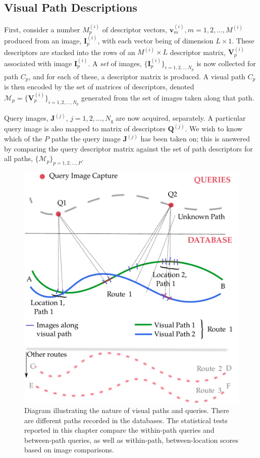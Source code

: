 \subsection{Visual Path Descriptions} First, consider a number $M_p^{(i)}$ of descriptor vectors, $\mathbf{v}_m^{(i)}, m=1,2,\ldots,M^{(i)}$ produced from an image, $\mathbf{I}^{(i)}_p$, with each vector being of  dimension $L \times 1$.  These descriptors are stacked into the rows of an $M^{(i)}\times L$ descriptor matrix, $\mathbf{V}^{(i)}_p$ associated with image $\mathbf{I}^{(i)}_p$.  A \textit{set} of images, $\lbrace \mathbf{I}^{(i)}_p\rbrace_{i=1,2,\ldots\,N_p}$ is now collected for path $C_p$, and for each of these, a descriptor matrix is produced.  A visual path $C_p$ is then encoded by the set of matrices of descriptors, denoted $\mathcal{M}_p=\lbrace \mathbf{V}^{(i)}_p \rbrace_{i=1,2,\ldots,N_p}$ generated from the set of images taken along that path.
 
Query images, $\mathbf{J}^{(j)}$, $j=1,2,\ldots,N_q$ are now acquired, separately.  A particular query image is also mapped to matrix of descriptors $\mathbf{Q}^{(j)}$. We wish to know which of the $P$ paths the query image $\mathbf{J}^{(j)}$ has been taken on; this is answered by comparing the query descriptor matrix against the set of path descriptors for all paths, $\lbrace \mathcal{M}_p \rbrace_{p=1,2,\ldots, P}$.

\begin{figure}
\centering
\includegraphics[width=\linewidth]{./gfx/Chapter02/pathexample.pdf}
\caption{Diagram illustrating the nature of visual paths and queries.  There are different paths recorded in the databases. The statistical tests reported in this chapter compare the within-path queries and between-path queries, as well as within-path, between-location scores based on image comparisons.}
\label{fig:pathexample}
\end{figure}


